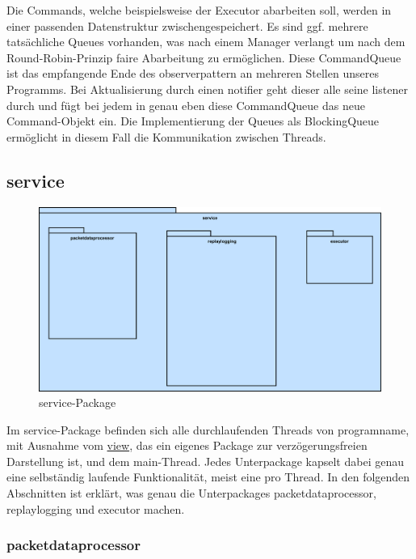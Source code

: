       \medskip
      Die Commands, welche beispielsweise der Executor abarbeiten soll, werden in
      einer passenden Datenstruktur zwischengespeichert. Es sind ggf. mehrere
      tatsächliche Queues vorhanden, was nach einem Manager verlangt um nach dem
      Round-Robin-Prinzip faire Abarbeitung zu ermöglichen. Diese CommandQueue
      ist das empfangende Ende des \gls{observerpattern} an mehreren Stellen unseres
      Programms. Bei Aktualisierung durch einen \gls{notifier} geht dieser alle
      seine \gls{listener} durch und fügt bei jedem in genau eben diese
      CommandQueue das neue Command-Objekt ein. Die Implementierung der Queues
      als BlockingQueue ermöglicht in diesem Fall die Kommunikation zwischen Threads.

\subsection{service}
\label{subsec:service}

\begin{figure}[H]
  \centering
  \includegraphics[width=\textwidth]{../diagramimages/service.png}
  \caption{service-Package}
\end{figure}

\medskip
Im service-Package befinden sich alle durchlaufenden Threads von \gls{programname},
mit Ausnahme vom \hyperref[subsec:view]{view}, das ein eigenes Package zur verzögerungsfreien Darstellung ist, und dem
main-Thread. Jedes Unterpackage kapselt dabei genau eine selbständig laufende Funktionalität, meist eine pro Thread. In den folgenden Abschnitten ist erklärt, was genau die Unterpackages packetdataprocessor, replaylogging und executor machen.

    \subsubsection{packetdataprocessor}
    \label{subsubsec:truffleprocessor}

